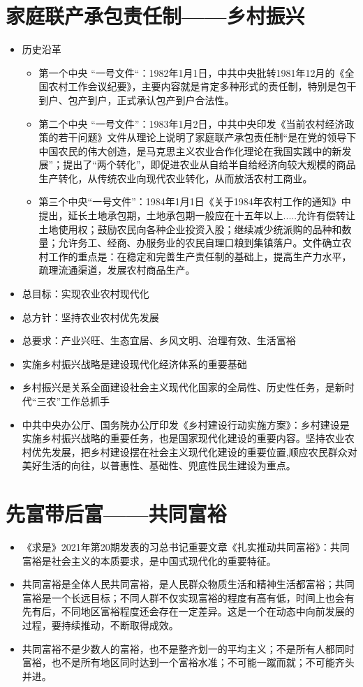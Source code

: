 \documentclass[12pt,openany]{ctexbook}
\begin{document}
\section{家庭联产承包责任制——乡村振兴}
\begin{itemize}
  \item 历史沿革
\begin{itemize}
  \item 第一个中央 “一号文件“：1982年1月1日，中共中央批转1981年12月的《全国农村工作会议纪要》，主要内容就是肯定多种形式的责任制，特别是包干到户、包产到户，正式承认包产到户合法性。
  \item 第二个中央 “一号文件”：1983年1月2日，中共中央印发《当前农村经济政策的若干问题》文件从理论上说明了家庭联产承包责任制“是在党的领导下中国农民的伟大创造，是马克思主义农业合作化理论在我国实践中的新发展”；提出了“两个转化”，即促进农业从自给半自给经济向较大规模的商品生产转化，从传统农业向现代农业转化，从而放活农村工商业。
  \item 第三个中央“一号文件”：1984年1月1日《关于1984年农村工作的通知》中提出，延长土地承包期，土地承包期一般应在十五年以上.....允许有偿转让土地使用权；鼓励农民向各种企业投资入股；继续减少统派购的品种和数量；允许务工、经商、办服务业的农民自理口粮到集镇落户。文件确立农村工作的重点是：在稳定和完善生产责任制的基础上，提高生产力水平，疏理流通渠道，发展农村商品生产。
\end{itemize}
  \item 总目标：实现农业农村现代化
  \item 总方针：坚持农业农村优先发展
  \item 总要求：产业兴旺、生态宜居、乡风文明、治理有效、生活富裕
  \item 实施乡村振兴战略是建设现代化经济体系的重要基础
  \item 乡村振兴是关系全面建设社会主义现代化国家的全局性、历史性任务，是新时代“三农”工作总抓手
  \item 中共中央办公厅、国务院办公厅印发《乡村建设行动实施方案》：乡村建设是实施乡村振兴战略的重要任务，也是国家现代化建设的重要内容。坚持农业农村优先发展，把乡村建设摆在社会主义现代化建设的重要位置,顺应农民群众对美好生活的向往，以普惠性、基础性、兜底性民生建设为重点。
\end{itemize}
\section{先富带后富——共同富裕}
\begin{itemize}
  \item 《求是》2021年第20期发表的习总书记重要文章《扎实推动共同富裕》：共同富裕是社会主义的本质要求，是中国式现代化的重要特征。
  \item 共同富裕是全体人民共同富裕，是人民群众物质生活和精神生活都富裕；共同富裕是一个长远目标；不同人群不仅实现富裕的程度有高有低，时间上也会有先有后，不同地区富裕程度还会存在一定差异。这是一个在动态中向前发展的过程，要持续推动，不断取得成效。
  \item 共同富裕不是少数人的富裕，也不是整齐划一的平均主义；不是所有人都同时富裕，也不是所有地区同时达到一个富裕水准；不可能一蹴而就；不可能齐头并进。
\end{itemize}
\end{document}
